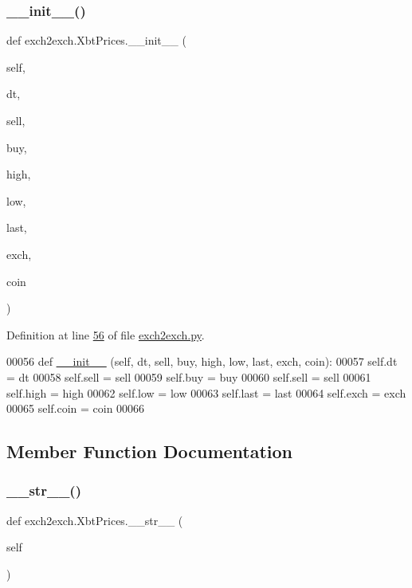 \subsubsection{\texorpdfstring{\+\_\+\+\_\+init\+\_\+\+\_\+()}{\_\_init\_\_()}}
{\footnotesize\ttfamily def exch2exch.\+Xbt\+Prices.\+\_\+\+\_\+init\+\_\+\+\_\+ (\begin{DoxyParamCaption}\item[{}]{self,  }\item[{}]{dt,  }\item[{}]{sell,  }\item[{}]{buy,  }\item[{}]{high,  }\item[{}]{low,  }\item[{}]{last,  }\item[{}]{exch,  }\item[{}]{coin }\end{DoxyParamCaption})}



Definition at line \hyperlink{exch2exch_8py_source_l00056}{56} of file \hyperlink{exch2exch_8py_source}{exch2exch.\+py}.


\begin{DoxyCode}
00056     \textcolor{keyword}{def }\hyperlink{namespacestart__time_a9c9bd378729a13c96a22c8b079ea172c}{\_\_init\_\_} (self, dt, sell, buy, high, low, last, exch, coin):
00057         self.dt   = dt
00058         self.sell = sell
00059         self.buy  = buy
00060         self.sell = sell
00061         self.high = high
00062         self.low  = low
00063         self.last = last
00064         self.exch = exch
00065         self.coin = coin
00066         
\end{DoxyCode}


\subsection{Member Function Documentation}
\mbox{\label{classexch2exch_1_1_xbt_prices_a1cf49c525e93b6615debba631e5801d7}} 
\subsubsection{\texorpdfstring{\+\_\+\+\_\+str\+\_\+\+\_\+()}{\_\_str\_\_()}}
{\footnotesize\ttfamily def exch2exch.\+Xbt\+Prices.\+\_\+\+\_\+str\+\_\+\+\_\+ (\begin{DoxyParamCaption}\item[{}]{self }\end{DoxyParamCaption})}




